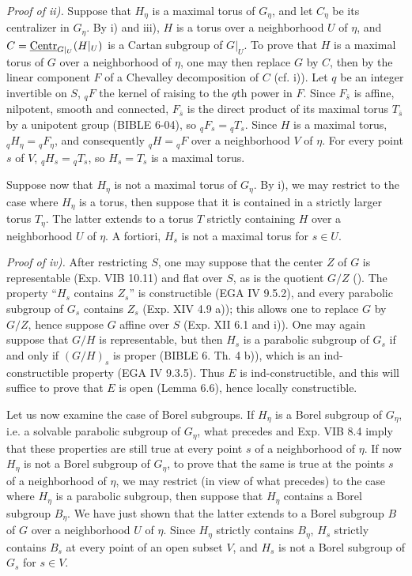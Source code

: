 \par\noindent\emph{Proof of ii).} Suppose that $H_\eta$ is a maximal torus of $G_\eta$, and let $C_\eta$ be its centralizer in $G_\eta$. By i) and iii), $H$ is a torus over a neighborhood $U$ of $\eta$, and $C=\underline{\mathrm{Centr}}_{G|_U}(H|_U)$ is a Cartan subgroup of $G|_U$. To prove that $H$ is a maximal torus of $G$ over a neighborhood of $\eta$, one may then replace $G$ by $C$, then by the linear component $F$ of a Chevalley decomposition of $C$ (cf. i)). Let $q$ be an integer invertible on $S$, ${}_qF$ the kernel of raising to the $q$th power in $F$. Since $F_{\bar s}$ is affine, nilpotent, smooth and connected, $F_{\bar s}$ is the direct product of its maximal torus $T_{\bar s}$ by a unipotent group (BIBLE 6-04), so ${}_qF_s={}_qT_s$. Since $H$ is a maximal torus, ${}_qH_\eta={}_qF_\eta$, and consequently ${}_qH={}_qF$ over a neighborhood $V$ of $\eta$. For every point $s$ of $V$, ${}_qH_s={}_qT_s$, so $H_s=T_s$ is a maximal torus.

Suppose now that $H_\eta$ is not a maximal torus of $G_\eta$. By i), we may restrict to the case where $H_\eta$ is a torus, then suppose that it is contained in a strictly larger torus $T_\eta$. The latter extends to a torus $T$ strictly containing $H$ over a neighborhood $U$ of $\eta$. A fortiori, $H_s$ is not a maximal torus for $s\in U$.

\par\noindent\emph{Proof of iv).} After restricting $S$, one may suppose that the center $Z$ of $G$ is representable (Exp. VIB 10.11) and flat over $S$, as is the quotient $G/Z$ (\loccit). The property ``$H_s$ contains $Z_s$'' is constructible (EGA IV 9.5.2), and every parabolic subgroup of $G_s$ contains $Z_s$ (Exp. XIV 4.9 a)); this allows one to replace $G$ by $G/Z$, hence suppose $G$ affine over $S$ (Exp. XII 6.1 and i)). One may again suppose that $G/H$ is representable, but then $H_s$ is a parabolic subgroup of $G_s$ if and only if $(G/H)_s$ is proper (BIBLE 6. Th. 4 b)), which is an ind-constructible property (EGA IV 9.3.5). Thus $E$ is ind-constructible, and this will suffice to prove that $E$ is open (Lemma 6.6), hence locally constructible.

Let us now examine the case of Borel subgroups. If $H_\eta$ is a Borel subgroup of $G_\eta$, i.e. a solvable parabolic subgroup of $G_\eta$, what precedes and Exp. VIB 8.4 imply that these properties are still true at every point $s$ of a neighborhood of $\eta$. If now $H_\eta$ is not a Borel subgroup of $G_\eta$, to prove that the same is true at the points $s$ of a neighborhood of $\eta$, we may restrict (in view of what precedes) to the case where $H_\eta$ is a parabolic subgroup, then suppose that $H_\eta$ contains a Borel subgroup $B_\eta$. We have just shown that the latter extends to a Borel subgroup $B$ of $G$ over a neighborhood $U$ of $\eta$. Since $H_\eta$ strictly contains $B_\eta$, $H_s$ strictly contains $B_s$ at every point of an open subset $V$, and $H_s$ is not a Borel subgroup of $G_s$ for $s\in V$.

